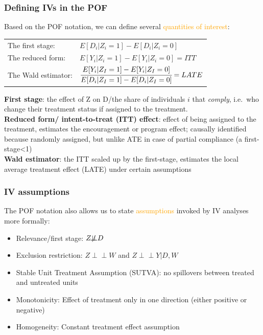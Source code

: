 \documentclass[12pt,english,dvipsnames,aspectratio=169,handout]{beamer}\usepackage[]{graphicx}\usepackage[]{xcolor}
\begin{document}
\begin{frame}
  \frametitle{Defining IVs in the POF}
Based on the POF notation, we can define several \textcolor{orange}{quantities of interest}:\\
    \vspace{3mm}
  \begin{table}\footnotesize
  \begin{tabular}{ll} 
    The first stage:    & $E[D_i|Z_i=1]-E[D_i|Z_i=0]$ \\
    The reduced form:   & $E[Y_i|Z_i=1]-E[Y_i|Z_i=0]=ITT$ \\
    \rule{0pt}{5ex}   
    The Wald estimator: &$\cfrac{E[Y_i|Z_I=1]-E[Y_i|Z_I=0]}{E[D_i|Z_I=1]-E[D_i|Z_I=0]}=LATE$\\
  \end{tabular}
  \end{table}

\scriptsize 
\textbf{First stage}: the effect of Z on D/the share of individuals $i$ that \emph{comply}, i.e.\ who change their treatment status if assigned to the treatment.  \\ 
\textbf{Reduced form/ intent-to-treat (ITT) effect}: effect of being assigned to the treatment, estimates the encouragement or program effect; causally identified because randomly assigned, but unlike ATE in case of partial compliance (a first-stage<1)\\
\textbf{Wald estimator}: the ITT scaled up by the first-stage, estimates the local average treatment effect (LATE) under certain assumptions
\end{frame}



\begin{frame}
  \frametitle{IV assumptions} 
The POF notation also allows us to state \textcolor{orange}{assumptions} invoked by IV analyses more formally:\\
  \begin{itemize} \footnotesize
    \item Relevance/first stage: $Z{\not\!\perp\!\!\!\perp}D$ \\
    \item Exclusion restriction:  $Z{\perp\!\!\!\perp}W$ and $Z{\perp\!\!\!\perp}\!Y|D,W$ \\
    \item Stable Unit Treatment Assumption (SUTVA): no spillovers between treated and untreated units \\
    \item Monotonicity: Effect of treatment only in one direction (either positive or negative) \\
    \item Homogeneity: Constant treatment effect assumption
  \end{itemize}
  \vspace{3cm}
\end{frame}
\end{document}
